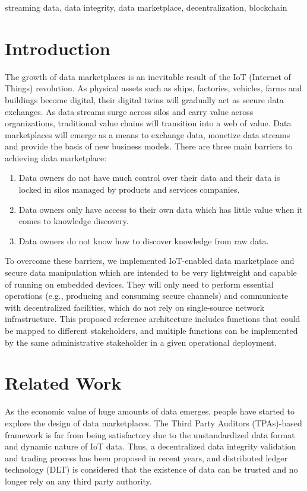 \documentclass[journal,10pt,a4paper]{IEEEtran}
\begin{document}
\begin{IEEEkeywords}
    streaming data, data integrity, data marketplace, decentralization, blockchain
\end{IEEEkeywords}

\section{\normalsize\textbf{Introduction}}
The growth of data marketplaces is an inevitable result of the IoT (Internet of Things) revolution. As physical assets such as ships, factories, vehicles, farms and buildings become digital, their digital twins will gradually act as secure data exchanges.\cite{digitaltwin}\cite{AutonomousDriving} As data streams surge across silos and carry value across organizations, traditional value chains will transition into a web of value. Data marketplaces will emerge as a means to exchange data, monetize data streams and provide the basis of new business models. There are three main barriers to achieving data marketplace:
\begin{enumerate}
    \item Data owners do not have much control over their data and their data is locked in silos managed by products and services companies.
    \item Data owners only have access to their own data which has little value when it comes to knowledge discovery.
    \item Data owners do not know how to discover knowledge from raw data.
\end{enumerate}

To overcome these barriers, we implemented IoT-enabled data marketplace and secure data manipulation which are intended to be very lightweight and capable of running on embedded devices. They will only need to perform essential operations (e.g., producing and consuming secure channels) and communicate with decentralized facilities, which do not rely on single-source network infrastructure. This proposed reference architecture includes functions that could be mapped to different stakeholders, and multiple functions can be implemented by the same administrative stakeholder in a given operational deployment.

\section{\normalsize\textbf{Related Work}}
As the economic value of huge amounts of data emerges, people have started to explore the design of data marketplaces. The Third Party Auditors (TPAs)-based framework\cite{TPA} is far from being satisfactory due to the unstandardized data format and dynamic nature of IoT data. Thus, a decentralized data integrity validation and trading process has been proposed in recent years, and distributed ledger technology (DLT) is considered that the existence of data can be trusted and no longer rely on any third party authority.
\end{document}
